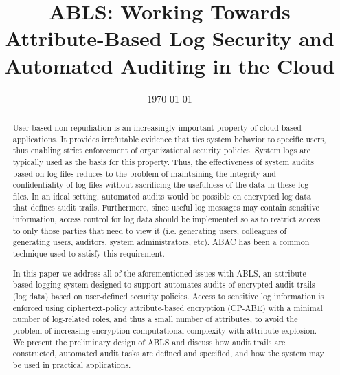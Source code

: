 \documentclass{sig-alternate}
\begin{document}
\title{ABLS: Working Towards Attribute-Based Log Security and Automated Auditing in the Cloud}
\author{
}
\date{\today}
\maketitle
\begin{abstract}
User-based non-repudiation is an increasingly important property of cloud-based applications. It provides irrefutable 
evidence that ties system behavior to specific users, thus enabling strict enforcement of organizational security policies. 
System logs are typically used as the basis for this property. Thus, the effectiveness of system audits based on log files 
reduces to the problem of maintaining the integrity and confidentiality of log files without sacrificing the usefulness
of the data in these log files. In an ideal setting, automated audits would be possible on encrypted log data that defines
audit trails. Furthermore, since useful log messages may contain sensitive information, access control for log 
data should be implemented so as to restrict access to only those parties that need to view it (i.e. generating users,
colleagues of generating users, auditors, system administrators, etc). ABAC has been a common technique used to
satisfy this requirement. %

In this paper we address all of the aforementioned issues with ABLS, an attribute-based logging system designed
to support automates audits of encrypted audit trails (log data) based on user-defined security policies. Access to
sensitive log information is enforced using ciphertext-policy attribute-based encryption (CP-ABE) with a minimal number
of log-related roles, and thus a small number of attributes, to avoid the problem of increasing encryption computational
complexity with attribute explosion. We present the preliminary design of ABLS and discuss how audit trails are 
constructed, automated audit tasks are defined and specified, and how the system may be used in practical applications.
\end{abstract}
\end{document}
